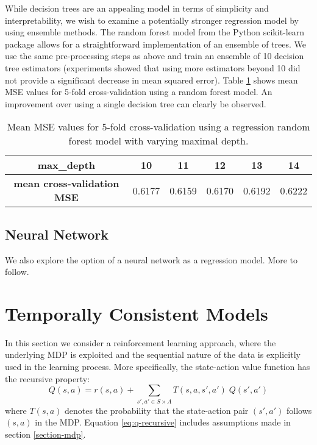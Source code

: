 \documentclass{sfuthesis}
\begin{document}
	While decision trees are an appealing model in terms of simplicity and interpretability, we wish to examine a potentially stronger regression model by using ensemble methods. The random forest model from the Python scikit-learn package allows for a straightforward implementation of an ensemble of trees. We use the same pre-processing steps as above and train an ensemble of 10 decision tree estimators (experiments showed that using more estimators beyond 10 did not provide a significant decrease in mean squared error). Table \ref{tab:forest-mse} shows mean MSE values for 5-fold cross-validation using a random forest model. An improvement over using a single decision tree can clearly be observed.
	\begin{table}[h]
		\centering
		\begin{tabular}{c|ccccc}
			\textbf{max\_depth}                & 10      & 11      & 12     & 13     & 14       \\ \hline
			\textbf{mean cross-validation MSE} & 0.6177 & 0.6159 & 0.6170 & 0.6192 & 0.6222
		\end{tabular}
		\caption{Mean MSE values for 5-fold cross-validation using a regression random forest model with varying maximal depth.}
		\label{tab:forest-mse}
	\end{table}
	
	\subsection{Neural Network}
	
	We also explore the option of a neural network as a regression model. More to follow.
	
	\section{Temporally Consistent Models}
	
	In this section we consider a reinforcement learning approach, where the underlying MDP is exploited and the sequential nature of the data is explicitly used in the learning process. More specifically, the state-action value function has the recursive property:
	\begin{equation}
		Q(s,a) = r(s,a) +\sum_{s',a' \in S \times A} T(s,a,s',a') \; Q(s', a')
		\label{eq:q-recursive}
	\end{equation}
	where $T(s,a)$ denotes the probability that the state-action pair $(s',a')$ follows $(s,a)$ in the MDP. Equation \eqref{eq:q-recursive} includes assumptions made in section \ref{section-mdp}.
	
\end{document}
